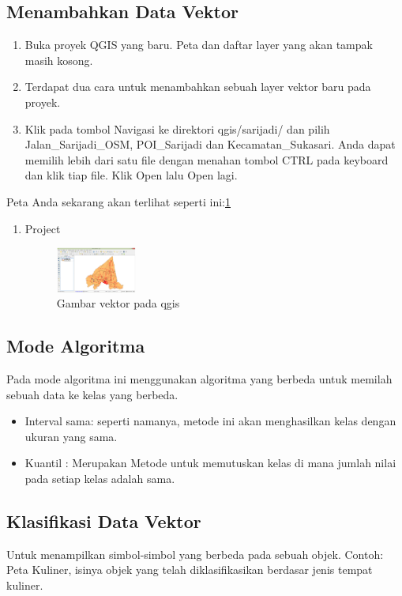 \subsection{Menambahkan Data Vektor}
\begin{enumerate}
\item 
Buka proyek QGIS yang baru. Peta dan daftar layer yang akan tampak masih kosong.
\item
Terdapat dua cara untuk menambahkan sebuah layer vektor baru pada proyek.
\item
Klik pada tombol Navigasi ke direktori qgis/sarijadi/ dan pilih Jalan\_Sarijadi\_OSM, POI\_Sarijadi dan Kecamatan\_Sukasari. Anda dapat memilih lebih dari satu file dengan menahan tombol CTRL pada keyboard dan klik tiap file. Klik Open lalu Open lagi.
\end{enumerate}

Peta Anda sekarang akan terlihat seperti ini:\ref{vektor}
\begin{enumerate}
\item
Project
\begin{figure}[ht]
    \centerline{\includegraphics[width=0.25\textwidth]{figures/vektor}}
    \caption{Gambar vektor pada qgis}
    \label{vektor}
    \end{figure}

\end{enumerate}

\subsection{Mode Algoritma}
Pada mode algoritma ini menggunakan algoritma yang berbeda untuk memilah sebuah data ke kelas yang berbeda.
\begin{itemize}
\item	Interval sama: seperti namanya, metode ini akan menghasilkan kelas dengan ukuran yang sama.
\item	Kuantil : Merupakan Metode untuk memutuskan kelas di mana jumlah nilai pada setiap kelas adalah sama.
\end{itemize}

\subsection{Klasifikasi Data Vektor}
Untuk menampilkan simbol-simbol yang berbeda pada sebuah objek. Contoh: Peta Kuliner, isinya objek yang telah diklasifikasikan berdasar jenis tempat kuliner.

